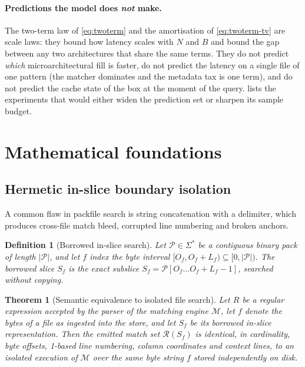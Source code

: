 \documentclass[11pt,letterpaper]{article}
\newtheorem{theorem}{Theorem}
\newtheorem{definition}{Definition}
\begin{document}
\paragraph{Predictions the model does \emph{not} make.}
The two-term law of \eqref{eq:twoterm} and the amortisation of
\eqref{eq:twoterm-tv} are scale laws: they bound how latency scales with
$N$ and $B$ and bound the gap between any two architectures that share
the same terms. They do not predict \emph{which} microarchitectural fill
is faster, do not predict the latency on a single file of one pattern
(the matcher dominates and the metadata tax is one term), and do not
predict the cache state of the box at the moment of the query.
 lists the experiments that would either widen the
prediction set or sharpen its sample budget.

\section{Mathematical foundations}
\label{sec:foundations}

\subsection{Hermetic in-slice boundary isolation}
A common flaw in packfile search is string concatenation with a delimiter,
which produces cross-file match bleed, corrupted line numbering and broken
anchors.

\begin{definition}[Borrowed in-slice search]
Let $\mathcal{P}\in\Sigma^{*}$ be a contiguous binary pack of length
$\lvert\mathcal{P}\rvert$, and let $f$ index the byte interval
$[O_f, O_f+L_f)\subseteq[0,\lvert\mathcal{P}\rvert)$. The borrowed slice
$S_f$ is the exact subslice $S_f=\mathcal{P}[O_f\dots O_f+L_f-1]$,
searched without copying.
\end{definition}

\begin{theorem}[Semantic equivalence to isolated file search]
\label{thm:equivalence}
Let $R$ be a regular expression accepted by the parser of the matching
engine $\mathcal{M}$, let $f$ denote the bytes of a file \emph{as ingested}
into the store, and let $S_f$ be its borrowed in-slice representation. Then
the emitted match set $\mathcal{R}(S_f)$ is identical, in cardinality, byte
offsets, 1-based line numbering, column coordinates and context lines, to
an isolated execution of $\mathcal{M}$ over the same byte string $f$ stored
independently on disk.
\end{theorem}
\end{document}
